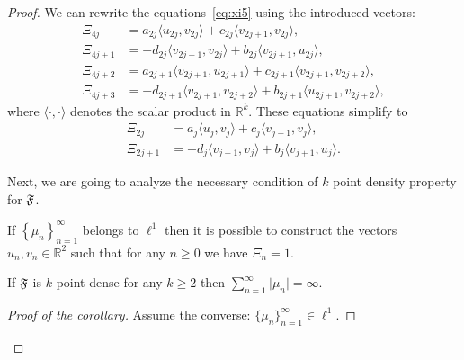 \begin{proof}
      We can rewrite the equations~\eqref{eq:xi5} using the introduced vectors:
      \begin{align*}
        \Xi_{4j} &= a_{2j} \langle u_{2j}, v_{2j}\rangle + c_{2j} \langle v_{2j+1}, v_{2j}\rangle,\\
        \Xi_{4j + 1} &= -d_{2j} \langle v_{2j+1}, v_{2j}\rangle + b_{2j} \langle v_{2j+1}, u_{2j}\rangle,\\
        \Xi_{4j + 2} &= a_{2j+1} \langle v_{2j+1}, u_{2j+1} \rangle + c_{2j+1} \langle v_{2j+1}, v_{2j+2} \rangle,\\
        \Xi_{4j + 3} &= -d_{2j+1} \langle v_{2j+1}, v_{2j+2}\rangle + b_{2j+1} \langle u_{2j+1}, v_{2j+2} \rangle,
      \end{align*}
        where $\langle\cdot, \cdot\rangle$ denotes the scalar product in $\mathbb{R}^k$.
      These equations simplify to
      \begin{align*}
        \Xi_{2j} &= a_{j} \langle u_{j}, v_{j} \rangle  + c_{j} \langle v_{j+1}, v_{j} \rangle,\\
        \Xi_{2j + 1} &= -d_{j} \langle v_{j+1}, v_{j} \rangle + b_{j} \langle v_{j+1}, u_{j}\rangle.
      \end{align*}

      Next, we are going to analyze the necessary condition of $k$ point density property for $\mathfrak{F}$.
      \begin{prop}
        \label{prop:2pd}
        If $\left\{\mu_n\right\}_{n=1}^\infty$ belongs to $\ell^1$ then it is possible to construct
          the vectors $u_n, v_n \in \mathbb{R}^2$ such that for any $n \geq 0$ we have $\Xi_n = 1$.
      \end{prop}
      \begin{corol}
        \label{corol:2density}
        If $\mathfrak{F}$ is $k$ point dense for any $k \geq 2$ then $\sum_{n=1}^\infty \lvert\mu_n\rvert = \infty$.
      \end{corol}
      \begin{proof}[Proof of the corollary]
        Assume the converse: $\{\mu_n\}_{n=1}^\infty \in \ell^1$.


\end{proof}
\end{proof}
